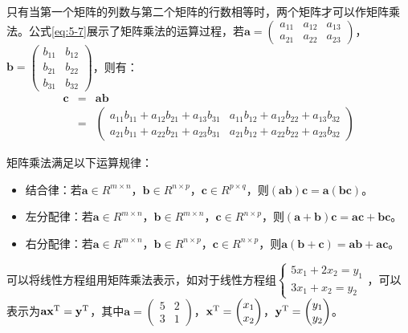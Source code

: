 \parinterval 只有当第一个矩阵的列数与第二个矩阵的行数相等时，两个矩阵才可以作矩阵乘法。公式\ref{eq:5-7}展示了矩阵乘法的运算过程，若$\mathbf a=\begin{pmatrix}a_{11} & a_{12}& a_{13}\\a_{21} & a_{22} & a_{23}\end{pmatrix}$，$\mathbf b=\begin{pmatrix}b_{11} & b_{12}\\b_{21} & b_{22}\\b_{31} & b_{32}\end{pmatrix} $，则有：
\vspace{-0.5em}
\begin{eqnarray}
\mathbf c & = & \mathbf a\mathbf b \nonumber \\
          & = & \begin{pmatrix}
   a_{11}b_{11}+a_{12}b_{21}+a_{13}b_{31} & a_{11}b_{12}+a_{12}b_{22}+a_{13}b_{32}\\
   a_{21}b_{11}+a_{22}b_{21}+a_{23}b_{31} & a_{21}b_{12}+a_{22}b_{22}+a_{23}b_{32}
\end{pmatrix}
\label{eq:5-7}
\end{eqnarray}

\parinterval 矩阵乘法满足以下运算规律：

\begin{itemize}
\vspace{0.5em}
\item 结合律：若$ \mathbf a\in R^{m\times n} $，$ \mathbf b\in R^{n\times p} $，$ \mathbf c\in R^{p\times q} $，则$ (\mathbf {ab})\mathbf c=\mathbf a(\mathbf {bc}) $。
\vspace{0.5em}
\item 左分配律：若$ \mathbf a\in R^{m\times n} $，$ \mathbf b\in R^{m\times n} $，$ \mathbf c\in R^{n\times p} $，则$ (\mathbf a+\mathbf b)\mathbf c=\mathbf {ac}+\mathbf {bc} $。
\vspace{0.5em}
\item 右分配律：若$ \mathbf a\in R^{m\times n} $，$ \mathbf b\in R^{n\times p} $，$ \mathbf c\in R^{n\times p} $，则$ \mathbf a(\mathbf b+\mathbf c)=\mathbf {ab}+\mathbf {ac} $。
\vspace{0.5em}
\end{itemize}

\begin{spacing}{1.4}
\parinterval 可以将线性方程组用矩阵乘法表示，如对于线性方程组$ \begin{cases} 5x_1+2x_2=y_1\\3x_1+x_2=y_2\end{cases} $，可以表示为$ \mathbf {ax}^{\rm T}=\mathbf y^{\rm T}$，其中$ \mathbf a = \begin{pmatrix} 5 & 2\\3 & 1\end{pmatrix} $，$ \mathbf x^{\rm T} = \begin{pmatrix} x_1\\x_2\end{pmatrix} $，$ \mathbf y^{\rm T} = \begin{pmatrix} y_1\\y_2\end{pmatrix} $。
\end{spacing}

